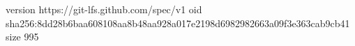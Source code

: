 version https://git-lfs.github.com/spec/v1
oid sha256:8dd28b6baa608108aa8b48aa928a017e2198d6982982663a09f3e363cab9cb41
size 995
